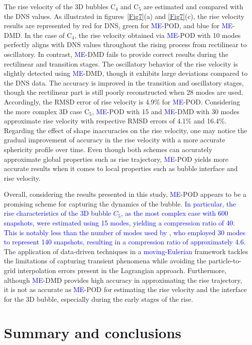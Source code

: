 \documentclass[a4paper,fleqn]{cas-sc}
\newcommand{\hl}[1]{\textcolor{blue}{#1}}
\newcommand{\hl}[1]{#1}
\begin{document}
	The rise velocity of the 3D bubbles C$_4$ and C$_5$ are estimated and compared with the DNS values. As illustrated in figures~\ref{Fig7}(a) and \ref{Fig7}(c), the rise velocity results are represented by red for DNS, green for \hl{ME}-POD, and blue for \hl{ME}-DMD. In the case of C$_4$, the rise velocity obtained via \hl{ME}-POD with 10 modes perfectly aligns with DNS values throughout the rising process from rectilinear to oscillatory. In contrast, \hl{ME}-DMD fails to provide correct results during the rectilinear and transition stages. The oscillatory behavior of the rise velocity is slightly detected using \hl{ME}-DMD, though it exhibits large deviations compared to the DNS data. The accuracy is improved in the transition and oscillatory stages, though the rectilinear part is still poorly reconstructed when 28 modes are used. Accordingly, the RMSD error of rise velocity is 4.9\% for \hl{ME}-POD. Considering the more complex 3D case C$_5$, \hl{ME}-POD with 15 and \hl{ME}-DMD with 30 modes approximate rise velocity with respective RMSD errors of 4.1\% and 16.4\%. Regarding the effect of shape inaccuracies on the rise velocity, one may notice the gradual improvement of accuracy in the rise velocity with a more accurate sphericity profile over time. Even though both schemes can accurately approximate global properties such as rise trajectory, \hl{ME}-POD yields more accurate results when it comes to local properties such as bubble interface and rise velocity.

	Overall, considering the results presented in this study, \hl{ME}-POD appears to be a promising scheme for capturing the dynamics of the bubble. \hl{In particular, the rise characteristics of the 3D bubble $C_5$, as the most complex case with 600 snapshots, were estimated using 15 modes, yielding a compression ratio of 40. This is notably less than the number of modes used by \citet{Yin2023a}, who employed 30 modes to represent 140 snapshots, resulting in a compression ratio of approximately 4.6.} The application of data-driven techniques in a \hl{moving-Eulerian} framework tackles the limitations of capturing transient phenomena while avoiding the particle-to-grid interpolation errors present in the Lagrangian approach. Furthermore, although \hl{ME}-DMD provides high accuracy in approximating the rise trajectory, it is not as accurate as \hl{ME}-POD for estimating the rise velocity and the interface for the 3D bubble, especially during the early stages of the rise.
	
	
	\section{Summary and conclusions}
	\label{Conclusion}
	
\end{document}
